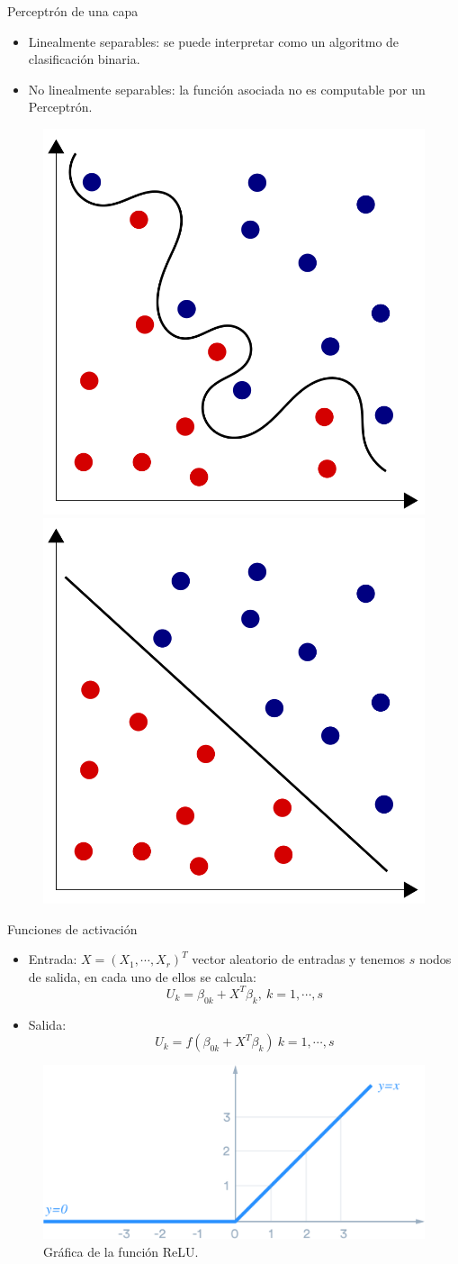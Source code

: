 \documentclass[spanish]{beamer}
\begin{document}
\begin{frame}{Perceptrón de una capa}
  \begin{itemize}
    \item Linealmente separables: se puede interpretar como un algoritmo de clasificación binaria.
    \item No linealmente separables: la función asociada no es computable por un Perceptrón.
  \end{itemize}
  \begin{figure}[h]
    \centering
    \includegraphics[width=.2\textwidth]{img/non-separable}
    \includegraphics[width=.2\textwidth]{img/separable}
  \end{figure}
\end{frame}

\begin{frame}{Funciones de activación}
  \begin{itemize}
    \item Entrada: $X=(X_1, \cdots , X_r)^T$ vector aleatorio de entradas y tenemos $s$ nodos de salida, en cada uno de ellos se calcula:
    $$U_k = \beta_{0k} + X^T \beta_{k} , \ k = 1, \cdots , s $$
    \item Salida: $$ U_k = f(\beta_{0k} + X^T \beta_k) \ k = 1, \cdots , s$$
  \end{itemize}
  \begin{figure}[h]
    \centering
    \includegraphics[width=.7\textwidth]{img/relu}
    \caption{Gráfica de la función ReLU.}
  \end{figure}
\end{frame}
\end{document}
